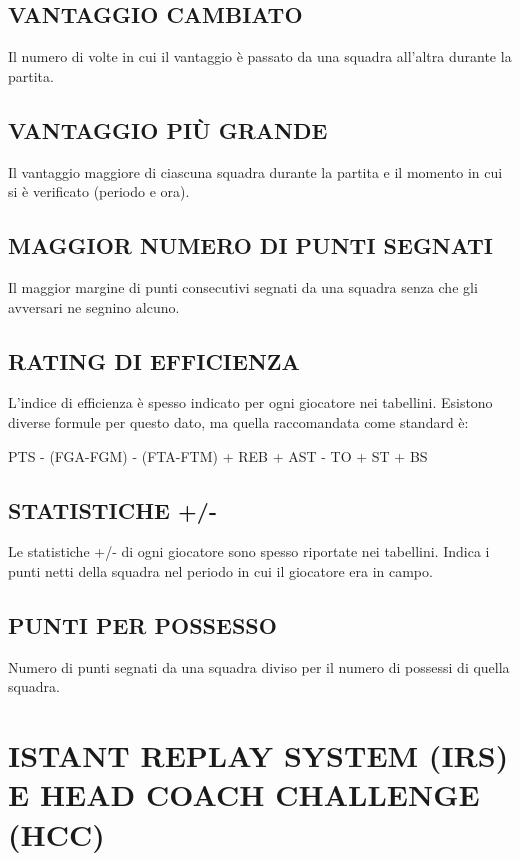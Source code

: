 \subsection*{VANTAGGIO CAMBIATO}
\subsectionline
Il numero di volte in cui il vantaggio è passato da una squadra all'altra durante la partita.

\subsection*{VANTAGGIO PIÙ GRANDE}
\subsectionline
Il vantaggio maggiore di ciascuna squadra durante la partita e il momento in cui si è verificato (periodo e ora).

\subsection*{MAGGIOR NUMERO DI PUNTI SEGNATI}
\subsectionline
Il maggior margine di punti consecutivi segnati da una squadra senza che gli avversari ne segnino alcuno.

\subsection*{RATING DI EFFICIENZA}
\subsectionline
L'indice di efficienza è spesso indicato per ogni giocatore nei tabellini. Esistono diverse formule per questo dato, ma quella raccomandata come standard è: 

PTS - (FGA-FGM) - (FTA-FTM) + REB + AST - TO + ST + BS

\subsection*{STATISTICHE +/-}
\subsectionline
Le statistiche +/- di ogni giocatore sono spesso riportate nei tabellini. Indica i punti netti della squadra nel periodo in cui il giocatore era in campo.

\subsection*{PUNTI PER POSSESSO}
\subsectionline
Numero di punti segnati da una squadra diviso per il numero di possessi di quella squadra.

\newpage
\section{ISTANT REPLAY SYSTEM (IRS) E HEAD COACH CHALLENGE (HCC)}
\sectionline

